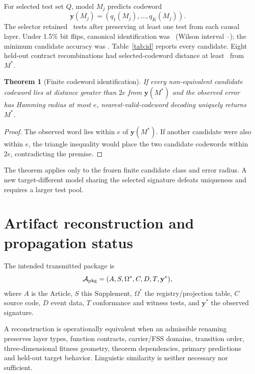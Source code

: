 \documentclass[10pt]{article}
\newtheorem{theorem}{Theorem}
\begin{document}
For selected test set $Q$, model $M_j$ predicts codeword
\begin{equation}
\mathbf y(M_j)=(q_1(M_j),\ldots,q_K(M_j)).
\end{equation}
The selector retained \CodeTests\ tests after preserving at least one test from each causal layer. Under 1.5\% bit flips, canonical identification was \CanonicalID\ (Wilson interval \CanonicalIDLo--\CanonicalIDHi); the minimum candidate accuracy was \MinCandidateID. Table~\ref{tab:id} reports every candidate. Eight held-out contract recombinations had selected-codeword distance at least \HeldoutDistance\ from $M^*$.

\begin{theorem}[Finite codeword identification]
If every non-equivalent candidate codeword lies at distance greater than $2e$ from $\mathbf y(M^*)$ and the observed error has Hamming radius at most $e$, nearest-valid-codeword decoding uniquely returns $M^*$.
\end{theorem}
\begin{proof}
The observed word lies within $e$ of $\mathbf y(M^*)$. If another candidate were also within $e$, the triangle inequality would place the two candidate codewords within $2e$, contradicting the premise.
\end{proof}

The theorem applies only to the frozen finite candidate class and error radius. A new target-different model sharing the selected signature defeats uniqueness and requires a larger test pool.

\section{Artifact reconstruction and propagation status}
\label{sec:propagation}
The intended transmitted package is
\begin{equation}
\mathcal A_{\rm pkg}=(A,S,\Omega^*,C,D,T,\mathbf y^*),
\end{equation}
where $A$ is the Article, $S$ this Supplement, $\Omega^*$ the registry/projection table, $C$ source code, $D$ event data, $T$ conformance and witness tests, and $\mathbf y^*$ the observed signature.

A reconstruction is operationally equivalent when an admissible renaming preserves layer types, function contracts, carrier/FSS domains, transition order, three-dimensional fitness geometry, theorem dependencies, primary predictions and held-out target behavior. Linguistic similarity is neither necessary nor sufficient.
\end{document}
